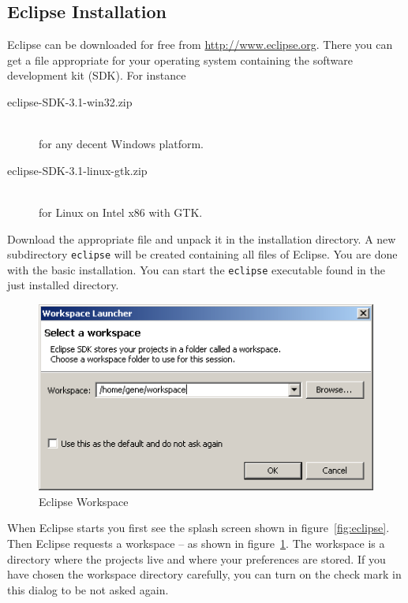 \documentclass{extex-doc}
\begin{document}
\subsection{Eclipse Installation}

Eclipse can be downloaded for free from \url{http://www.eclipse.org}.
There you can get a file appropriate for your operating system
containing the software development kit (SDK). For instance
\begin{description}
\item [eclipse-SDK-3.1-win32.zip]\ \\
  for any decent Windows platform.
\item [eclipse-SDK-3.1-linux-gtk.zip]\ \\
  for Linux on Intel x86 with GTK.
\end{description}

Download the appropriate file and unpack it in the installation
directory. A new subdirectory \texttt{eclipse} will be created
containing all files of Eclipse. You are done with the basic
installation. You can start the \texttt{eclipse} executable found in
the just installed directory.

\begin{figure}[h]
  \centering  \includegraphics[scale=.5]{image/eclipse-workspace}
  \caption{Eclipse Workspace}\label{fig:eclipse-workspace}
\end{figure}
When Eclipse starts you first see the splash screen shown in
figure~\ref{fig:eclipse}. Then Eclipse requests a workspace -- as
shown in figure~\ref{fig:eclipse-workspace}. The workspace is a
directory where the projects live and where your preferences are
stored. If you have chosen the workspace directory carefully, you can
turn on the check mark in this dialog to be not asked again.
\end{document}
